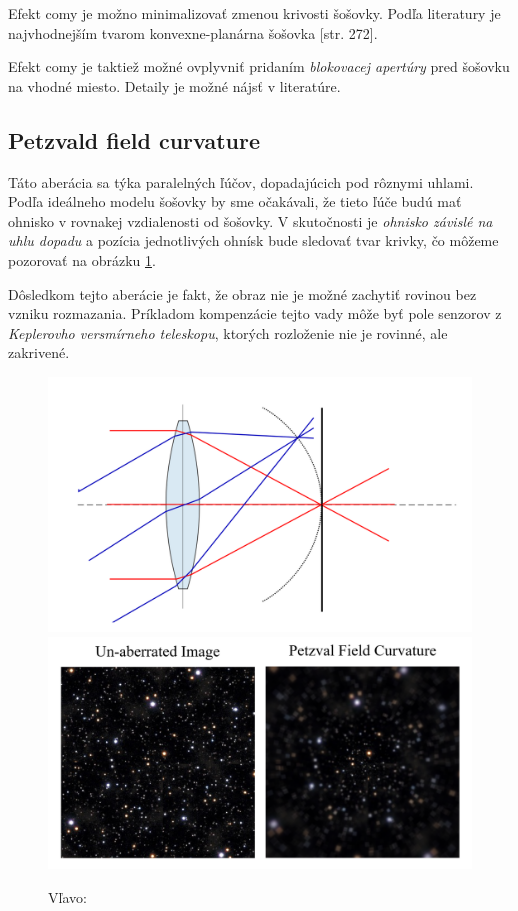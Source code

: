 Efekt comy je možno minimalizovať zmenou krivosti šošovky. Podľa literatury je najvhodnejším tvarom 
konvexne-planárna šošovka \cite{hechtoptics}[str. 272].

Efekt comy je taktiež možné ovplyvniť pridaním \textit{blokovacej apertúry} pred šošovku na vhodné miesto.
Detaily je možné nájsť v literatúre\cite{hechtoptics}.


\subsection{Petzvald field curvature}
Táto aberácia sa týka paralelných ľúčov, dopadajúcich pod rôznymi uhlami. Podľa ideálneho modelu
šošovky by sme očakávali, že tieto ľúče budú mať ohnisko v rovnakej vzdialenosti od šošovky. 
V skutočnosti je \textit{ohnisko závislé na uhlu dopadu} a pozícia jednotlivých ohnísk bude sledovať tvar
krivky, čo môžeme pozorovať na obrázku \ref{comaDescribe}.

Dôsledkom tejto aberácie je fakt, že obraz nie je možné zachytiť rovinou bez vzniku rozmazania. 
Príkladom kompenzácie tejto vady môže byť pole senzorov z \textit{Keplerovho versmírneho teleskopu},
ktorých rozloženie nie je rovinné, ale zakrivené.

\begin{figure}[h]
    \label{comaDescribe}
\includegraphics[scale=0.15]{obrazky-figures/fieldcurvature.png}
\includegraphics[scale=0.60]{obrazky-figures/fieldAberration.png}
    \centering \caption{Vľavo: }
\end{figure}



